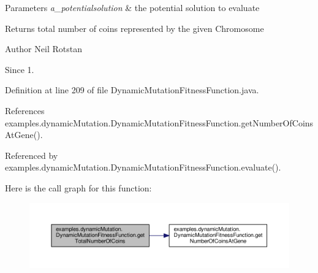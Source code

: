 \begin{DoxyParams}{Parameters}
{\em a\-\_\-potentialsolution} & the potential solution to evaluate \\
\hline
\end{DoxyParams}
\begin{DoxyReturn}{Returns}
total number of coins represented by the given Chromosome
\end{DoxyReturn}
\begin{DoxyAuthor}{Author}
Neil Rotstan 
\end{DoxyAuthor}
\begin{DoxySince}{Since}
1. 
\end{DoxySince}


Definition at line 209 of file Dynamic\-Mutation\-Fitness\-Function.\-java.



References examples.\-dynamic\-Mutation.\-Dynamic\-Mutation\-Fitness\-Function.\-get\-Number\-Of\-Coins\-At\-Gene().



Referenced by examples.\-dynamic\-Mutation.\-Dynamic\-Mutation\-Fitness\-Function.\-evaluate().



Here is the call graph for this function\-:
\nopagebreak
\begin{figure}[H]
\begin{center}
\leavevmode
\includegraphics[width=350pt]{classexamples_1_1dynamic_mutation_1_1_dynamic_mutation_fitness_function_a7f9f9883b5852d180835d2bab53f3f65_cgraph}
\end{center}
\end{figure}




